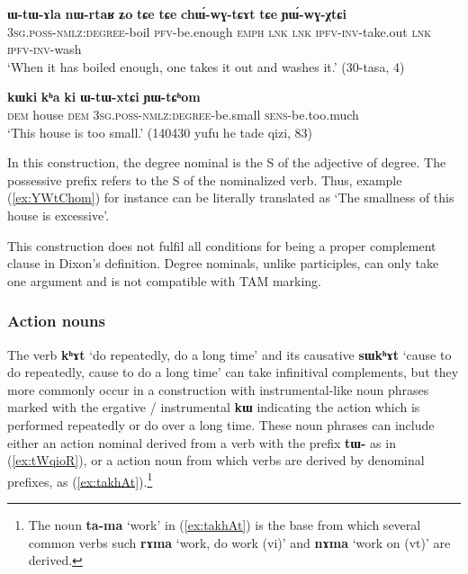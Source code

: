 \documentclass[oneside,a4paper,11pt]{article}
\newcommand{\ipa}[1]{\textbf{\phon#1}} %
\newcommand{\jpg}[2]{\ipa{#1} `#2'} %
\newcommand{\refb}[1]{(\ref{#1})}
\begin{document}
\begin{exe}
\ex \label{ex:nWrtaR}
\gll \ipa{ɯ-tɯ-ɤla} 	\ipa{nɯ-rtaʁ} 	\ipa{ʑo} 	\ipa{tɕe} 	\ipa{tɕe} 	\ipa{chɯ́-wɣ-tɕɤt} 	\ipa{tɕe} 	\ipa{ɲɯ́-wɣ-χtɕi} \\
\textsc{3sg.poss-nmlz:degree}-boil \textsc{pfv}-be.enough \textsc{emph} \textsc{lnk} \textsc{lnk} \textsc{ipfv-inv}-take.out  \textsc{lnk} \textsc{ipfv-inv}-wash \\
\glt `When it has boiled enough, one takes it out and washes it.' (30-tasa, 4)
\end{exe}

\begin{exe}
\ex \label{ex:YWtChom}
\gll
\ipa{kɯki} 	\ipa{kʰa} 	\ipa{ki} 	\ipa{ɯ-tɯ-xtɕi} 	\ipa{ɲɯ-tɕʰom} \\
\textsc{dem} house \textsc{dem} \textsc{3sg.poss-nmlz:degree}-be.small \textsc{sens}-be.too.much \\
\glt `This house is too small.' (140430 yufu he tade qizi, 83)
\end{exe}

In this construction, the degree nominal is the S of the adjective of degree. The possessive prefix refers to the S of the nominalized verb. Thus, example (\ref{ex:YWtChom}) for instance can be literally translated as `The smallness of this house is excessive'. 

This construction does not fulfil all conditions for being a proper complement clause in Dixon's definition. Degree nominals, unlike participles, can only take one argument and is not compatible with TAM marking.

  \subsubsection{Action nouns}  \label{sec:nouns}
 The verb \jpg{kʰɤt}{do repeatedly, do a long time} and its causative  \jpg{sɯkʰɤt}{cause to do repeatedly, cause to do a long time} can take infinitival complements, but they more commonly occur in a construction with instrumental-like noun phrases marked with the ergative / instrumental \ipa{kɯ} indicating the action which is performed repeatedly or do over a long time. These noun phrases can include either an action nominal derived from a verb with the prefix \ipa{tɯ-} as in \refb{ex:tWqioR}, or a action noun from which verbs are derived by denominal prefixes, as \refb{ex:takhAt}.\footnote{The noun \jpg{ta-ma}{work} in \refb{ex:takhAt} is the base from which several common verbs such \jpg{rɤma}{work, do work (vi)} and \jpg{nɤma}{work on (vt)} are derived.  }
 
\end{document}
